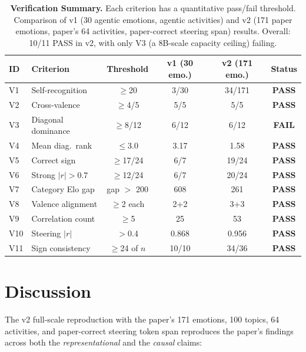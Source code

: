 \documentclass[11pt,a4paper]{article}
\newcommand{\pass}{\textcolor{passgreen}{\textbf{PASS}}}
\newcommand{\fail}{\textcolor{failred}{\textbf{FAIL}}}
\begin{document}
\begin{table}[htbp]
  \centering
  \caption{\textbf{Verification Summary.} Each criterion has a
  quantitative pass/fail threshold.  Comparison of v1 (30 agentic
  emotions, agentic activities) and v2 (171 paper emotions, paper's
  64 activities, paper-correct steering span) results.  Overall:
  10/11 PASS in v2, with only V3 (a 8B-scale capacity ceiling)
  failing.}
  \label{tab:summary}
  \small
  \begin{tabular}{llcccc}
    \toprule
    \textbf{ID} & \textbf{Criterion} & \textbf{Threshold}
      & \textbf{v1 (30 emo.)}
      & \textbf{v2 (171 emo.)} & \textbf{Status} \\
    \midrule
    V1  & Self-recognition    & $\geq$20
        & 3/30    & 34/171   & \pass \\
    V2  & Cross-valence       & $\geq$4/5
        & 5/5     & 5/5      & \pass \\
    V3  & Diagonal dominance  & $\geq$8/12
        & 6/12    & 6/12     & \fail \\
    V4  & Mean diag.\ rank    & $\leq$3.0
        & 3.17    & 1.58     & \pass \\
    V5  & Correct sign        & $\geq$17/24
        & 6/7     & 19/24    & \pass \\
    V6  & Strong $|r|{>}0.7$  & $\geq$12/24
        & 6/7     & 20/24    & \pass \\
    V7  & Category Elo gap    & gap $>$ 200
        & 608     & 261      & \pass \\
    V8  & Valence alignment   & $\geq$2 each
        & 2+2     & 3+3      & \pass \\
    V9  & Correlation count   & $\geq$5
        & 25      & 53       & \pass \\
    V10 & Steering $|r|$      & $>$0.4
        & 0.868   & 0.956    & \pass \\
    V11 & Sign consistency    & $\geq$24 of $n$
        & 10/10   & 34/36    & \pass \\
    \bottomrule
  \end{tabular}
\end{table}

\section{Discussion}

The v2 full-scale reproduction with the paper's 171 emotions, 100
topics, 64 activities, and paper-correct steering token span
reproduces the paper's findings across both the \emph{representational}
and the \emph{causal} claims:
\end{document}
